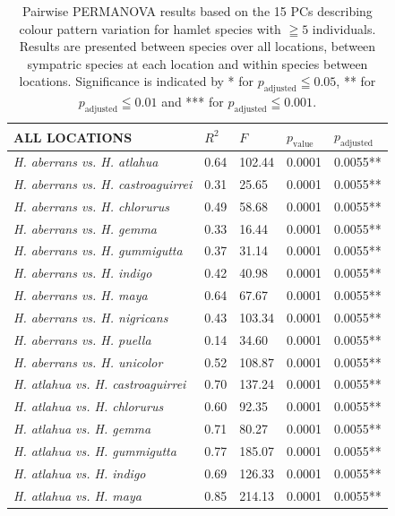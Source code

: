 
\begin{xltabular}{\textwidth}{p{5cm}*{4}{X}}
\captionsetup{justification=justified}
\caption{Pairwise PERMANOVA results based on the 15 PCs describing colour pattern variation for hamlet species with $\geqq 5$ individuals. Results are presented between species over all locations, between sympatric species at each location and within species between locations. Significance is indicated by * for $p_{\text{adjusted}} \leqq 0.05$, ** for $p_{\text{adjusted}} \leqq 0.01$ and *** for $p_{\text{adjusted}} \leqq 0.001$.}
\label{tab:s2}
    \hline \hline
    \textbf{ALL LOCATIONS} & $R^2$ & $F$ & $p_{\text{value}}$ & $p_{\text{adjusted}}$\\
    \hline
    \hline
    \hline
    \emph{H. aberrans vs. H. atlahua} & 0.64 & 102.44 & 0.0001 & 0.0055** \\
    \emph{H. aberrans vs. H. castroaguirrei} & 0.31 & 25.65 & 0.0001 & 0.0055** \\
    \emph{H. aberrans vs. H. chlorurus} & 0.49 & 58.68 & 0.0001 & 0.0055** \\
    \emph{H. aberrans vs. H. gemma} & 0.33 & 16.44 & 0.0001 & 0.0055** \\
    \emph{H. aberrans vs. H. gummigutta} & 0.37 & 31.14 & 0.0001 & 0.0055** \\
    \emph{H. aberrans vs. H. indigo} & 0.42 & 40.98 & 0.0001 & 0.0055** \\
    \emph{H. aberrans vs. H. maya} & 0.64 & 67.67 & 0.0001 & 0.0055** \\
    \emph{H. aberrans vs. H. nigricans} & 0.43 & 103.34 & 0.0001 & 0.0055** \\
    \emph{H. aberrans vs. H. puella} & 0.14 & 34.60 & 0.0001 & 0.0055** \\
    \emph{H. aberrans vs. H. unicolor} & 0.52 & 108.87 & 0.0001 & 0.0055** \\
    \emph{H. atlahua vs. H. castroaguirrei} & 0.70 & 137.24 & 0.0001 & 0.0055** \\
    \emph{H. atlahua vs. H. chlorurus} & 0.60 & 92.35 & 0.0001 & 0.0055** \\
    \emph{H. atlahua vs. H. gemma} & 0.71 & 80.27 & 0.0001 & 0.0055** \\ 
    \emph{H. atlahua vs. H. gummigutta} & 0.77 & 185.07 & 0.0001 & 0.0055** \\
    \emph{H. atlahua vs. H. indigo} & 0.69 & 126.33 & 0.0001 & 0.0055** \\  
    \emph{H. atlahua vs. H. maya} & 0.85 & 214.13 & 0.0001 & 0.0055** \\

\end{xltabular}
